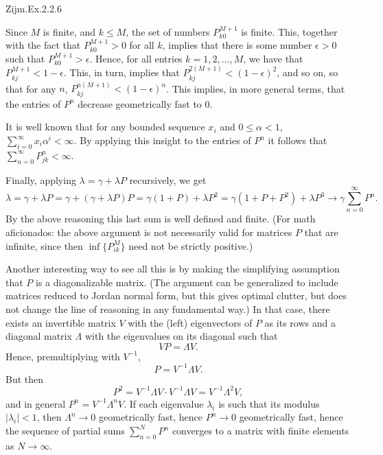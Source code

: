 \begin{exercise}
Zijm.Ex.2.2.6
\begin{solution}
 Since $M$ is finite, and $k\leq M$, the set of numbers $P^{M+1}_{k0}$ is finite.
 This, together with the fact that $P^{M+1}_{k0}>0$ for all $k$, implies that there is some number $\epsilon>0$ such that $P^{M+1}_{k0}>\epsilon$.
 Hence, for all entries $k=1, 2, \ldots, M$, we have that $P^{M+1}_{kj} < 1- \epsilon$.
 This, in turn, implies that $P^{2(M+1)}_{kj} < (1- \epsilon)^2$, and so on, so that for any $n$, $P^{n(M+1)}_{kj} < (1- \epsilon)^n$.
 This implies, in more general terms, that the entries of $P^n$ decrease geometrically fast to $0$.

 It is well known that for any bounded sequence $x_i$ and $0\leq \alpha < 1$, $ \sum_{i=0}^\infty x_i \alpha^i < \infty$.
 By applying this insight to the entries of $P^n$ it follows that $\sum_{n=0}^\infty P^n_{jk} < \infty$.

Finally, applying $\lambda = \gamma + \lambda P$ recursively, we get
\begin{equation*}
 \lambda = \gamma + \lambda P = \gamma + (\gamma + \lambda P)P = \gamma (1+P) + \lambda P^2 = \gamma(1+P+P^2) + \lambda P^3 \to \gamma \sum_{n=0}^\infty P^n.
\end{equation*}
By the above reasoning this last sum is well defined and finite.
(For math aficionados: the above argument is not necessarily valid for matrices $P$ that are infinite, since then $\inf\{P^{M}_{ik}\}$ need not be strictly positive.)

Another interesting way to see all this is by making the simplifying assumption that $P$ is a diagonalizable matrix.
(The argument can be generalized to include matrices reduced to Jordan normal form, but this gives optimal clutter, but does not change the line of reasoning in any fundamental way.)
In that case, there exists an invertible matrix $V$ with the (left) eigenvectors of $P$ as its rows and a diagonal matrix $\Lambda$ with the eigenvalues on its diagonal such that
\begin{equation*}
 V P = \Lambda V.
\end{equation*}
Hence, premultiplying with $V^{-1}$, 
\begin{equation*}
 P = V^{-1}\Lambda V.
\end{equation*}
But then
\begin{equation*}
P^2 = V^{-1}\Lambda V \cdot V^{-1}\Lambda V= V^{-1}\Lambda^2 V,
\end{equation*}
and in general $P^n = V^{-1}\Lambda^n V$.
If each eigenvalue $\lambda_i$ is such that its modulus $|\lambda_i| < 1$, then $\Lambda^n \to 0$ geometrically fast, hence $P^n\to 0$ geometrically fast, hence the sequence of partial sums $\sum_{n=0}^N P^n$ converges to a matrix with finite elements as $N\to\infty$.


\end{solution}
\end{exercise}
